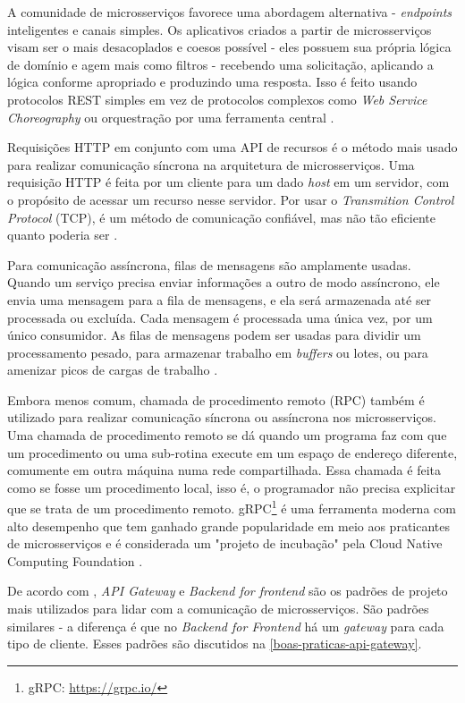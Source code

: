 A comunidade de microsserviços favorece uma abordagem alternativa - \emph{endpoints} inteligentes e canais simples. Os aplicativos criados a partir de microsserviços visam ser o mais desacoplados e coesos possível - eles possuem sua própria lógica de domínio e agem mais como filtros - recebendo uma solicitação, aplicando a lógica conforme apropriado e produzindo uma resposta. Isso é feito usando protocolos REST simples em vez de protocolos complexos como \emph{Web Service Choreography} ou orquestração por uma ferramenta central \cite{martin-fowler-microservices}.

Requisições HTTP em conjunto com uma API de recursos é o método mais usado para realizar comunicação síncrona na arquitetura de microsserviços. Uma requisição HTTP é feita por um cliente para um dado \emph{host} em um servidor, com o propósito de acessar um recurso nesse servidor. Por usar o \emph{Transmition Control Protocol} (TCP), é um método de comunicação confiável, mas não tão eficiente quanto poderia ser \cite{martin-fowler-microservices}.

Para comunicação assíncrona, filas de mensagens são amplamente usadas. Quando um serviço precisa enviar informações a outro de modo assíncrono, ele envia uma mensagem para a fila de mensagens, e ela será armazenada até ser processada ou excluída. Cada mensagem é processada uma única vez, por um único consumidor. As filas de mensagens podem ser usadas para dividir um processamento pesado, para armazenar trabalho em \emph{buffers} ou lotes, ou para amenizar picos de cargas de trabalho \cite{amazon-filas-de-mensagens}.

Embora menos comum, chamada de procedimento remoto (RPC) também é utilizado para realizar comunicação síncrona ou assíncrona nos microsserviços. Uma chamada de procedimento remoto se dá quando um programa faz com que um procedimento ou uma sub-rotina execute em um espaço de endereço diferente, comumente em outra máquina numa rede compartilhada. Essa chamada é feita como se fosse um procedimento local, isso é, o programador não precisa explicitar que se trata de um procedimento remoto. gRPC\footnote{gRPC: \url{https://grpc.io/}} é uma ferramenta moderna com alto desempenho que tem ganhado grande popularidade em meio aos praticantes de microsserviços e é considerada um "projeto de incubação" pela Cloud Native Computing Foundation \cite{microsoft-grpc}.

De acordo com , \emph{API Gateway} e \emph{Backend for frontend} são os padrões de projeto mais utilizados para lidar com a comunicação de microsserviços. São padrões similares - a diferença é que no \emph{Backend for Frontend} há um \emph{gateway} para cada tipo de cliente. Esses padrões são discutidos na \autoref{boas-praticas-api-gateway}. 

